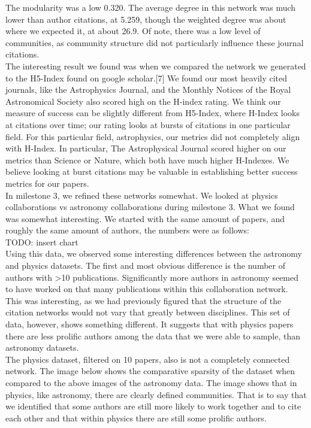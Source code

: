 \documentclass[times, 10pt,twocolumn]{article}
\begin{document}
The modularity was a low 0.320. The average degree in this network was much lower than author citations, at 5.259, though the weighted degree was about where we expected it, at about 26.9. Of note, there was a low level of communities, as community structure did not particularly influence these journal citations.\\

The interesting result we found was when we compared the network we generated to the H5-Index found on google scholar.[7] We found our most heavily cited journals, like the Astrophysics Journal, and the Monthly Notices of the Royal Astronomical Society also scored high on the H-index rating. We think our measure of success can be slightly different from H5-Index, where H-Index looks at citations over time; our rating looks at bursts of citations in one particular field. For this particular field, astrophysics, our metrics did not completely align with H-Index. In particular, The Astrophysical Journal scored higher on our metrics than Science or Nature, which both have much higher H-Indexes. We believe looking at burst citations may be valuable in establishing better success metrics for our papers.\\

In milestone 3, we refined these networks somewhat. We looked at physics collaborations vs astronomy collaborations during milestone 3. What we found was somewhat interesting. We started with the same amount of papers, and roughly the same amount of authors, the numbers were as follows: \\

TODO: insert chart\\

Using this data, we observed some interesting differences between the astronomy and physics datasets. The first and most obvious difference is the number of authors with >10 publications. Significantly more authors in astronomy seemed to have worked on that many publications within this collaboration network. \\

This was interesting, as we had previously figured that the structure of the citation networks would not vary that greatly between disciplines. This set of data, however, shows something different. It suggests that with physics papers there are less prolific authors among the data that we were able to sample, than astronomy datasets. \\

The physics dataset, filtered on 10 papers, also is not a completely connected network. The image below shows the comparative sparsity of the dataset when compared to the above images of the astronomy data. The image shows that in physics, like astronomy, there are clearly defined communities. That is to say that we identified that some authors are still more likely to work together and to cite each other and that within physics there are still some prolific authors. \\
\end{document}

